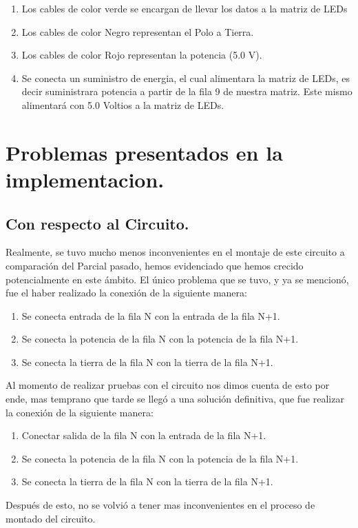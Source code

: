 \documentclass{article}
\begin{document}
\begin{enumerate}
    \item Los cables de color verde se encargan de llevar los datos a la matriz de LEDs
    \item Los cables de color Negro representan el Polo a Tierra.
    \item Los cables de color Rojo representan la potencia (5.0 V).
    \item Se conecta un suministro de energia, el cual alimentara la matriz de LEDs, es decir suministrara potencia a partir de la fila 9 de nuestra matriz. Este mismo alimentará con 5.0 Voltios a la matriz de LEDs.
\end{enumerate}
\section{Problemas presentados en la implementacion.} \label{problemas}
\subsection{Con respecto al Circuito.}
Realmente, se tuvo mucho menos inconvenientes en el montaje de este circuito a comparación del Parcial pasado, hemos evidenciado que hemos crecido potencialmente en este ámbito.
El único problema que se tuvo, y ya se mencionó, fue el haber realizado la conexión de la siguiente manera: 
\begin{enumerate}
    \item Se conecta entrada de la fila N con la entrada de la fila N+1.
    \item Se conecta la potencia de la fila N con la potencia de la fila N+1.
    \item Se conecta la tierra de la fila N con la tierra de la fila N+1.
\end{enumerate}
Al momento de realizar pruebas con el circuito nos dimos cuenta de esto por ende, mas temprano que tarde se llegó a una solución definitiva, que fue realizar la conexión de la siguiente manera:
\begin{enumerate}
    \item Conectar salida de la fila N con la entrada de la fila N+1.
    \item Se conecta la potencia de la fila N con la potencia de la fila N+1.
    \item Se conecta la tierra de la fila N con la tierra de la fila N+1.
\end{enumerate}
Después de esto, no se volvió a tener mas inconvenientes en el proceso de montado del circuito.
\end{document}
